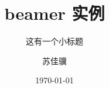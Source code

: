 \documentclass{beamer}
\begin{document}
   
        \title{beamer 实例}  
        \subtitle{这有一个小标题}
        \date{\today} 
        \author{苏佳骥}
        \frame{\titlepage}

        
\end{document}
